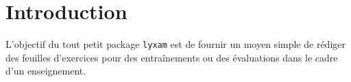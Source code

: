 \documentclass[12pt,a4paper]{scrartcl}
\begin{document}
\section{Introduction}

L'objectif du tout petit package \verb+lyxam+ est de fournir un moyen simple de rédiger des feuilles d'exercices pour des entraînements ou des évaluations dans le cadre d'un enseignement.
\end{document}
